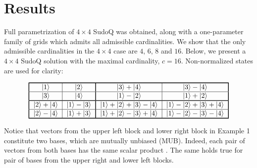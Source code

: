 \documentclass[aps,onecolumn,floatfix,superscriptaddress]{revtex4}
\begin{document}
\section{Results}
Full parametrization of $4\times 4$ SudoQ was obtained, along with a one-parameter family of grids which admits all admissible cardinalities. 
We show that the only admissible cardinalities in the $4 \times 4$ case are $4$, $6$, $8$ and $16$.
Below, we present a $4 \times 4$ SudoQ solution with the maximal cardinality, $c = 16$. Non-normalized states are used for clarity:
\begin{example}{}\label{ex:4x4_card16}
\[
 \begin{tabular}{!{\vrule width 1pt}c|c!{\vrule width 1pt}c|c!{\vrule width 1pt}}
    \noalign{\hrule height 1pt}
    $\ket{1}$ & $\ket{2}$ & $\ket{3}+\ket{4}$ & $\ket{3}-\ket{4}$ \tabularnewline
    \hline
    $\ket{3}$ & $\ket{4}$ & $\ket{1}-\ket{2}$ & $\ket{1}+\ket{2}$ \tabularnewline
    \noalign{\hrule height 1pt}
    $\ket{2}+\ket{4}$ & $\ket{1}-\ket{3}$ & $\ket{1}+\ket{2}+\ket{3}-\ket{4}$ & $\ket{1}-\ket{2}+\ket{3}+\ket{4}$ \tabularnewline
    \hline
    $\ket{2}-\ket{4}$ & $\ket{1}+\ket{3}$ & $\ket{1}+\ket{2}-\ket{3}+\ket{4}$ & $\ket{1}-\ket{2}-\ket{3}-\ket{4}$ \tabularnewline
    \noalign{\hrule height 1pt}
\end{tabular}
\]
\end{example}

Notice that vectors from the upper left block and lower right block in Example 1 constitute two bases, which are mutually unbiased (MUB). Indeed, each pair of vectors from both bases has the same scalar product \cite{Ivonovic_1981,Wooters_1989}. The same holds true for pair of bases from the upper right and lower left blocks.
\end{document}
